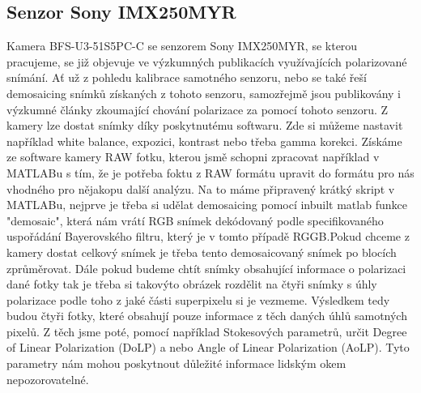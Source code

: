 \documentclass[a4paper]{article}
\numberwithin{equation}{section}
\begin{document}
    \subsection{Senzor Sony IMX250MYR}
    Kamera BFS-U3-51S5PC-C se senzorem Sony IMX250MYR, se kterou pracujeme, se již objevuje ve výzkumných publikacích využívajících polarizované snímání. Ať už z pohledu kalibrace samotného senzoru, nebo se také řeší demosaicing snímků získaných z tohoto senzoru, samozřejmě jsou publikovány i výzkumné články zkoumající chování polarizace za pomocí tohoto senzoru.\footnotemark[1]\cite{kalibrace,kalibrace2,aplikace} Z kamery lze dostat snímky díky poskytnutému softwaru. Zde si můžeme nastavit například white balance, expozici, kontrast nebo třeba gamma korekci. Získáme ze software kamery RAW fotku, kterou jsmě schopni zpracovat například v MATLABu s tím, že je potřeba foktu z RAW formátu upravit do formátu pro nás vhodného pro nějakopu další analýzu. Na to máme připravený krátký skript v MATLABu, nejprve je třeba si udělat demosaicing pomocí inbuilt matlab funkce "demosaic", která nám vrátí RGB snímek dekódovaný podle specifikovaného uspořádání Bayerovského filtru, který je v tomto případě RGGB.\footnotemark[2] Pokud chceme z kamery dostat celkový snímek je třeba tento demosaicovaný snímek po blocích zprůměrovat. Dále pokud budeme chtít snímky obsahující informace o polarizaci dané fotky tak je třeba si takovýto obrázek rozdělit na čtyři snímky s úhly polarizace podle toho z jaké části superpixelu si je vezmeme. Výsledkem tedy budou čtyři fotky, které obsahují pouze informace z těch daných úhlů samotných pixelů. Z těch jsme poté, pomocí například Stokesových parametrů, určit Degree of Linear Polarization (DoLP) a nebo Angle of Linear Polarization (AoLP). Tyto parametry nám mohou poskytnout důležité informace lidským okem  nepozorovatelné.\footnotemark[3]

\end{document}
